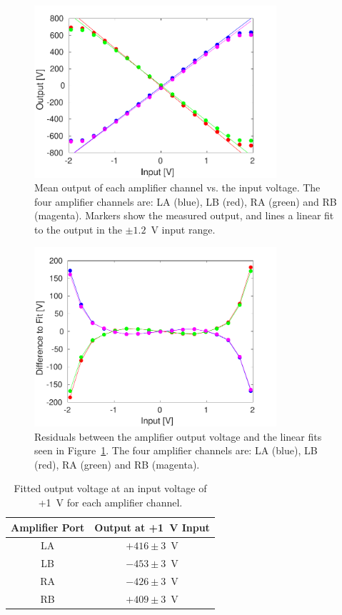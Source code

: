 \begin{figure}
  \centering
  \includegraphics[width=0.8\textwidth]{Figures/commissioning/AmpOutvsDAC}
  \caption{Mean output of each amplifier channel vs. the input voltage. The four amplifier channels are: LA (blue), LB (red), RA (green) and RB (magenta). Markers show the measured output, and lines a linear fit to the output in the \(\pm1.2\)~V input range.}
  \label{f:AmpOutvsDAC}
\end{figure}

\begin{figure}
  \centering
  \includegraphics[width=0.8\textwidth]{Figures/commissioning/AmpOutvsDAC_residual}
  \caption{Residuals between the amplifier output voltage and the linear fits seen in Figure~\ref{f:AmpOutvsDAC}. The four amplifier channels are: LA (blue), LB (red), RA (green) and RB (magenta). }
  \label{f:AmpOutvsDAC_residual}
\end{figure}

\begin{table}
  \begin{center}
    \begin{tabular}{| c | c |}
	   \hline
       Amplifier Port & Output at +1~V Input \\ \hline
       LA & \(+416\pm3\)~V \\
	   LB & \(-453\pm3\)~V \\
	   RA & \(-426\pm3\)~V \\
	   RB & \(+409\pm3\)~V \\
 	   \hline
    \end{tabular}
    \caption{Fitted output voltage at an input voltage of +1~V for each amplifier channel.}
  	\label{t:AmpOutVsDAC}
  \end{center}
\end{table}

